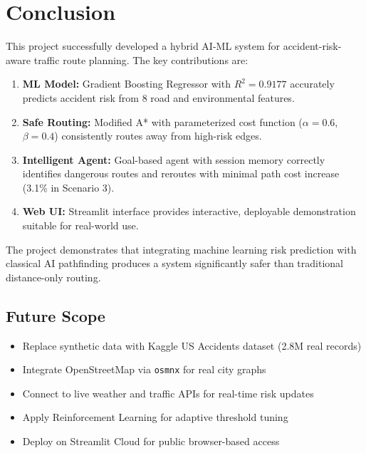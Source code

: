 \documentclass[12pt,a4paper]{report}
\begin{document}
\chapter{Conclusion}

This project successfully developed a hybrid AI-ML system for accident-risk-aware traffic route planning. The key contributions are:

\begin{enumerate}
  \item \textbf{ML Model:} Gradient Boosting Regressor with $R^2 = 0.9177$ accurately predicts accident risk from 8 road and environmental features.
  \item \textbf{Safe Routing:} Modified A* with parameterized cost function ($\alpha=0.6$, $\beta=0.4$) consistently routes away from high-risk edges.
  \item \textbf{Intelligent Agent:} Goal-based agent with session memory correctly identifies dangerous routes and reroutes with minimal path cost increase (3.1\% in Scenario 3).
  \item \textbf{Web UI:} Streamlit interface provides interactive, deployable demonstration suitable for real-world use.
\end{enumerate}

The project demonstrates that integrating machine learning risk prediction with classical AI pathfinding produces a system significantly safer than traditional distance-only routing.

\section{Future Scope}
\begin{itemize}
  \item Replace synthetic data with Kaggle US Accidents dataset (2.8M real records)
  \item Integrate OpenStreetMap via \texttt{osmnx} for real city graphs
  \item Connect to live weather and traffic APIs for real-time risk updates
  \item Apply Reinforcement Learning for adaptive threshold tuning
  \item Deploy on Streamlit Cloud for public browser-based access
\end{itemize}

\end{document}
